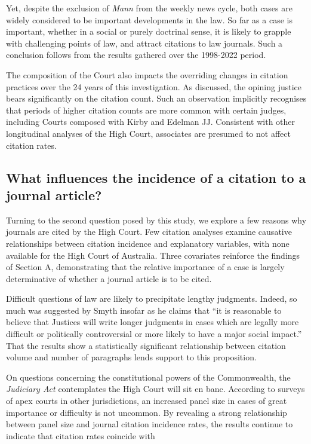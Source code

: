 Yet, despite the exclusion of \textit{Mann} from the weekly news cycle, both cases are widely considered to be important developments in the law. So far as a case is important, whether in a social or purely doctrinal sense, it is likely to grapple with challenging points of law, and attract citations to law journals. Such a conclusion follows from the results gathered over the 1998-2022 period.

The composition of the Court also impacts the overriding changes in citation practices over the 24 years of this investigation. As discussed, the opining justice bears significantly on the citation count. Such an observation implicitly recognises that periods of higher citation counts are more common with certain judges, including Courts composed with Kirby and Edelman JJ. Consistent with other longitudinal analyses of the High Court, associates are presumed to not affect citation rates.


\subsection{What influences the incidence of a citation to a journal article?}

Turning to the second question posed by this study, we explore a few reasons why journals are cited by the High Court. Few citation analyses examine causative relationships between citation incidence and explanatory variables, with none available for the High Court of Australia. Three covariates reinforce the findings of Section A, demonstrating that the relative importance of a case is largely determinative of whether a journal article is to be cited.

Difficult questions of law are likely to precipitate lengthy judgments. Indeed, so much was suggested by Smyth insofar as he claims that ``it is reasonable to believe that Justices will write longer judgments in cases which are legally more difficult or politically controversial or more likely to have a major social impact.'' That the results show a statistically significant relationship between citation volume and number of paragraphs lends support to this proposition.

On questions concerning the constitutional powers of the Commonwealth, the \textit{Judiciary Act} contemplates the High Court will sit en banc. According to surveys of apex courts in other jurisdictions, an increased panel size in cases of great importance or difficulty is not uncommon. By revealing a strong relationship between panel size and journal citation incidence rates, the results continue to indicate that citation rates coincide with 

